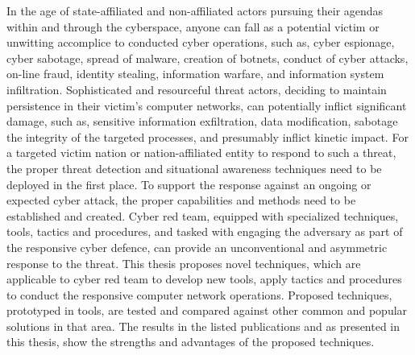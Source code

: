 In the age of state-affiliated and non-affiliated actors pursuing their agendas within and through the cyberspace, anyone can fall as a potential victim or unwitting accomplice to conducted cyber operations, such as, cyber espionage, cyber sabotage, spread of malware, creation of botnets, conduct of cyber attacks, on-line fraud, identity stealing, information warfare, and information system infiltration. Sophisticated and resourceful threat actors, deciding to maintain persistence in their victim's computer networks, can potentially inflict significant damage, such as, sensitive information exfiltration, data modification, sabotage the integrity of the targeted processes, and presumably inflict kinetic impact. For a targeted victim nation or nation-affiliated entity to respond to such a threat, the proper threat detection and situational awareness techniques need to be deployed in the first place. To support the response against an ongoing or expected cyber attack, the proper capabilities and methods need to be established and created. Cyber red team, equipped with specialized techniques, tools, tactics and procedures, and tasked with engaging the adversary as part of the responsive cyber defence, can provide an unconventional and asymmetric response to the threat. This thesis proposes novel techniques, which are applicable to cyber red team to develop new tools, apply tactics and procedures to conduct the responsive computer network operations. Proposed techniques, prototyped in tools, are tested and compared against other common and popular solutions in that area. The results in the listed publications and as presented in this thesis, show the strengths and advantages of the proposed techniques.

